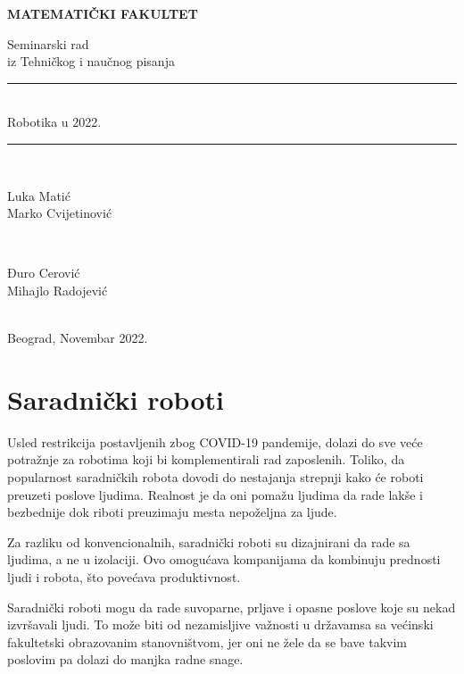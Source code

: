 \documentclass{report}
\newcommand{\HRule}{\rule{\linewidth}{0.5mm}}
\begin{document}
\vspace*{5cm}
\thispagestyle{empty}
\centerline{\huge \textbf{MATEMATIČKI FAKULTET}}
\vspace{2cm}

\begin{center}

{\Large Seminarski rad}\\
{\Large	iz Tehničkog i naučnog pisanja}\\
\Huge\HRule\\[0.4cm] %
	{Robotika u 2022.}\\
	\HRule \\[20pt] %
\begin{minipage}{0.4\textwidth}
\begin{flushleft} \large
{\Large Luka Matić}\\
{\Large Marko Cvijetinović}
\end{flushleft}
\end{minipage}
~
\begin{minipage}{0.4\textwidth}
\begin{flushright} \large
{\Large Đuro Cerović} \\
{\Large Mihajlo Radojević}\\ 
\end{flushright}
\end{minipage}\\[5cm]
\Large{Beograd, Novembar 2022.}
\end{center}

\tableofcontents
\chapter{Saradnički roboti}

Usled restrikcija postavljenih zbog COVID-19 pandemije, dolazi do sve veće potražnje za robotima koji bi komplementirali rad zaposlenih. Toliko, da popularnost saradničkih robota dovodi do nestajanja strepnji kako će roboti preuzeti poslove ljudima. Realnost je da oni pomažu ljudima da rade lakše i bezbednije dok riboti preuzimaju mesta nepoželjna za ljude.

Za razliku od konvencionalnih, saradnički roboti su dizajnirani da rade sa ljudima, a ne u izolaciji. Ovo omogućava kompanijama da kombinuju prednosti ljudi i robota, što povećava produktivnost. \cite{robotics2022}

Saradnički roboti mogu da rade suvoparne, prljave i opasne poslove koje su nekad izvršavali ljudi. To može biti od nezamisljive važnosti u državamsa sa većinski fakultetski obrazovanim stanovništvom, jer oni ne žele da se bave takvim poslovim pa dolazi do manjka radne snage.
\end{document}
